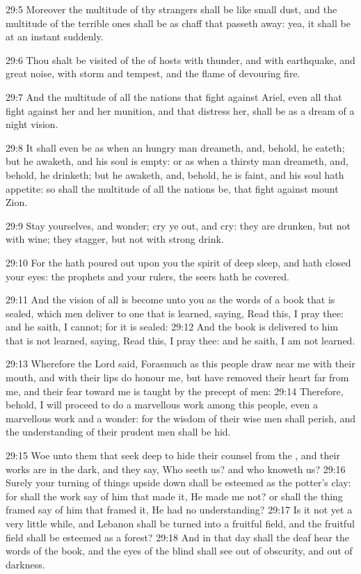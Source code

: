 29:5 Moreover the multitude of thy strangers shall be like small dust, and the multitude of the terrible ones shall be as chaff that passeth away: yea, it shall be at an instant suddenly.

29:6 Thou shalt be visited of the \LORD of hosts with thunder, and with earthquake, and great noise, with storm and tempest, and the flame of devouring fire.

29:7 And the multitude of all the nations that fight against Ariel, even all that fight against her and her munition, and that distress her, shall be as a dream of a night vision.

29:8 It shall even be as when an hungry man dreameth, and, behold, he eateth; but he awaketh, and his soul is empty: or as when a thirsty man dreameth, and, behold, he drinketh; but he awaketh, and, behold, he is faint, and his soul hath appetite: so shall the multitude of all the nations be, that fight against mount Zion.

29:9 Stay yourselves, and wonder; cry ye out, and cry: they are drunken, but not with wine; they stagger, but not with strong drink.

29:10 For the \LORD hath poured out upon you the spirit of deep sleep, and hath closed your eyes: the prophets and your rulers, the seers hath he covered.

29:11 And the vision of all is become unto you as the words of a book that is sealed, which men deliver to one that is learned, saying, Read this, I pray thee: and he saith, I cannot; for it is sealed: 29:12 And the book is delivered to him that is not learned, saying, Read this, I pray thee: and he saith, I am not learned.

29:13 Wherefore the Lord said, Forasmuch as this people draw near me with their mouth, and with their lips do honour me, but have removed their heart far from me, and their fear toward me is taught by the precept of men: 29:14 Therefore, behold, I will proceed to do a marvellous work among this people, even a marvellous work and a wonder: for the wisdom of their wise men shall perish, and the understanding of their prudent men shall be hid.

29:15 Woe unto them that seek deep to hide their counsel from the \LORD, and their works are in the dark, and they say, Who seeth us? and who knoweth us?  29:16 Surely your turning of things upside down shall be esteemed as the potter's clay: for shall the work say of him that made it, He made me not? or shall the thing framed say of him that framed it, He had no understanding?  29:17 Is it not yet a very little while, and Lebanon shall be turned into a fruitful field, and the fruitful field shall be esteemed as a forest?  29:18 And in that day shall the deaf hear the words of the book, and the eyes of the blind shall see out of obscurity, and out of darkness.

